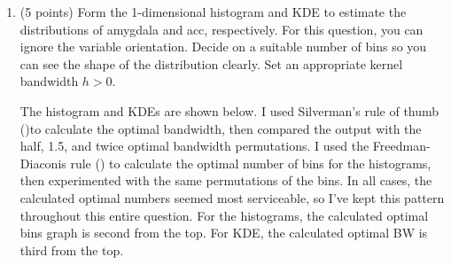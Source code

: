 \documentclass[twoside,12pt]{article}
\begin{document}
 \begin{enumerate}[label*=\arabic*.]
 
 
 \item (5 points) Form the 1-dimensional histogram and KDE to estimate the distributions of \textsf{amygdala} and \textsf{acc}, respectively. For this question, you can ignore the variable \textsf{orientation}. Decide on a suitable number of bins so you can see the shape of the distribution clearly. Set an appropriate kernel bandwidth $h >0$. 
 
 The histogram and KDEs are shown below. I used Silverman's rule of thumb (\cite{enwiki:1305066115})to calculate the optimal bandwidth, then compared the output with the half, 1.5, and twice optimal bandwidth permutations. I used the Freedman-Diaconis rule (\cite{se862}) to calculate the optimal number of bins for the histograms, then experimented with the same permutations of the bins. In all cases, the calculated optimal numbers seemed most serviceable, so I've kept this pattern throughout this entire question. For the histograms, the calculated optimal bins graph is second from the top. For KDE, the calculated optimal BW is third from the top. 


\end{enumerate}
\end{document}
